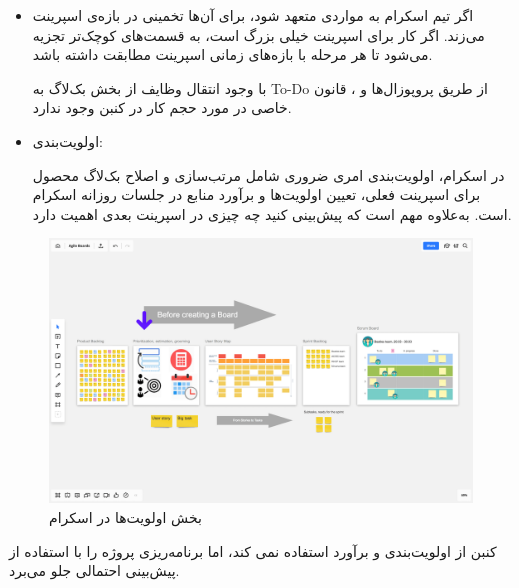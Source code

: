 {\begin{itemize}
اسکرام یوزر استوری را بهترین روش برای تجزیه موارد بزرگ از بک‌لاگ محصول به بک‌لاگ اسپرینت می‌داند. بنابر راهنمای چابک، ویژگی‌ها و وظایف باید همراه با جزئیاتی مانند آزمون‌های پذیرش، طرح‌های رابط کاربری و ... باشند.

کنبن هم از یک روش بک‌لاگ استفاده می‌کند که عموما اما نه الزاما مشابه یک یوزر استوری است.

\item اگر تیم اسکرام به مواردی متعهد شود، برای آن‌ها تخمینی در بازه‌ی اسپرینت می‌زند. اگر کار برای اسپرینت خیلی بزرگ است، به قسمت‌های کوچک‌تر تجزیه می‌شود تا هر مرحله با بازه‌های زمانی اسپرینت مطابقت داشته باشد.

با وجود انتقال وظایف از بخش بک‌لاگ به To-Do از طریق پروپوزال‌ها و ، قانون خاصی در مورد حجم کار در کنبن وجود ندارد.

\item اولویت‌بندی:

در اسکرام، اولویت‌بندی امری ضروری شامل مرتب‌سازی و اصلاح بک‌لاگ محصول برای اسپرینت فعلی، تعیین اولویت‌ها و برآورد منابع در جلسات روزانه اسکرام است. به‌علاوه مهم است که پیش‌بینی کنید چه چیزی در اسپرینت بعدی اهمیت دارد.
\end{itemize}
    
\begin{figure}
	\centering
	\includegraphics[scale=0.3]{figs/4-2-c}
	\caption{بخش اولویت‌ها در اسکرام}
\end{figure}

کنبن از اولویت‌بندی و برآورد استفاده نمی کند، اما برنامه‌ریزی پروژه را با استفاده از پیش‌بینی احتمالی جلو می‌برد.

}
